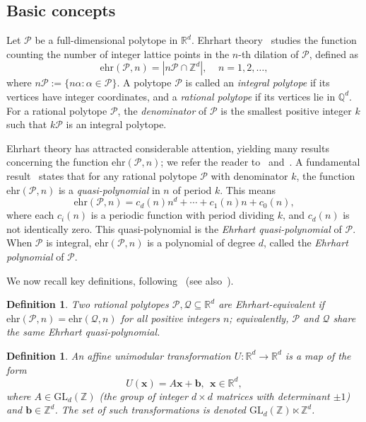 \documentclass[reqno, 12pt]{article}
\theoremstyle{mydefinition}
\newtheorem{dfn}[thm]{Definition}
\theoremstyle{myremark}
\numberwithin{algorithm}{section}
\begin{document}
\subsection{Basic concepts}
Let $\mathcal{P}$ be a full-dimensional polytope in $\mathbb{R}^{d}$. Ehrhart theory~\cite{Ehrhart62} studies the function counting the number of integer lattice points in the $n$-th dilation of $\mathcal{P}$, defined as
\[\mathrm{ehr}(\mathcal{P},n)=|n\mathcal{P}\cap \mathbb{Z}^d|,\ \ \ \ \ n=1,2,\ldots,\]
where $n\mathcal{P}:=\{n \alpha : \alpha \in \mathcal{P}\}$. A polytope $\mathcal{P}$ is called an \emph{integral polytope} if its vertices have integer coordinates, and a \emph{rational polytope} if its vertices lie in $\mathbb{Q}^{d}$. For a rational polytope $\mathcal{P}$, the \emph{denominator} of $\mathcal P$ is the smallest positive integer $k$ such that $k\mathcal{P}$ is an integral polytope.

Ehrhart theory has attracted considerable attention, yielding many results concerning the function $\mathrm{ehr}(\mathcal{P},n)$; we refer the reader to~\cite{BeckRobins} and~\cite[Chapter 4]{Stanley-Vol-1}. A fundamental result~\cite{Ehrhart62} states that for any rational polytope $\mathcal{P}$ with denominator $k$, the function $\mathrm{ehr}(\mathcal{P},n)$ is a \emph{quasi-polynomial} in $n$ of period $k$. This means
\[\mathrm{ehr}(\mathcal{P},n)=c_d(n)n^d+\cdots +c_1(n)n+c_0(n),\]
where each $c_i(n)$ is a periodic function with period dividing $k$, and $c_d(n)$ is not identically zero. This quasi-polynomial is the \emph{Ehrhart quasi-polynomial} of $\mathcal{P}$. When $\mathcal{P}$ is integral, $\mathrm{ehr}(\mathcal{P},n)$ is a polynomial of degree $d$, called the \emph{Ehrhart polynomial} of $\mathcal{P}$.

We now recall key definitions, following~\cite{Turner-Wu} (see also~\cite{Haase-McAllister,Greenberg}).

\begin{dfn}
Two rational polytopes $\mathcal{P}, \mathcal{Q}\subseteq \mathbb{R}^d$ are \emph{Ehrhart-equivalent} if $\mathrm{ehr}(\mathcal{P},n)=\mathrm{ehr}(\mathcal{Q},n)$ for all positive integers $n$; equivalently, $\mathcal{P}$ and $\mathcal{Q}$ share the same Ehrhart quasi-polynomial.
\end{dfn}

\begin{dfn}
An \emph{affine unimodular transformation} $U: \mathbb{R}^d\rightarrow \mathbb{R}^d$ is a map of the form
\[U(\mathbf{x})=A\mathbf{x}+\mathbf{b},\ \ \mathbf{x}\in \mathbb{R}^d,\]
where $A \in \mathrm{GL}_d(\mathbb{Z})$ (the group of integer $d\times d$ matrices with determinant $\pm 1$) and $\mathbf{b}\in \mathbb{Z}^d$. The set of such transformations is denoted $\mathrm{GL}_d(\mathbb{Z})\ltimes \mathbb{Z}^d$.
\end{dfn}
\end{document}
